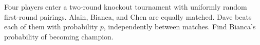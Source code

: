 Four players enter a two-round knockout tournament with uniformly random first-round pairings. Alain, Bianca, and Chen are equally matched. Dave beats each of them with probability $p$, independently between matches. Find Bianca's probability of becoming champion.
